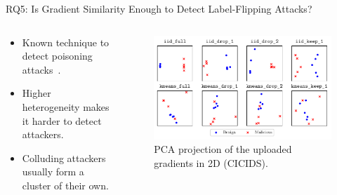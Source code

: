 

\begin{frame}{RQ5: Is Gradient Similarity Enough to Detect Label-Flipping Attacks?}

  \begin{columns}
    \begin{column}{.45\textwidth}
      \begin{itemize}
        \item Known technique to detect poisoning attacks~\autocite{tolpegin_DataPoisoningAttacks_2020}.
        \item Higher heterogeneity makes it harder to detect attackers.
        \item Colluding attackers usually form a cluster of their own.
      \end{itemize}
    \end{column}
    \begin{column}{.55\textwidth}
      \begin{figure}
        \centering
        \includegraphics[width=\textwidth]{figures/assessment/similarity-untargeted-colluding-cicids.pdf}
        \caption{PCA projection of the uploaded gradients in 2D (CICIDS).}
      \end{figure}
    \end{column}
  \end{columns}


\end{frame}

